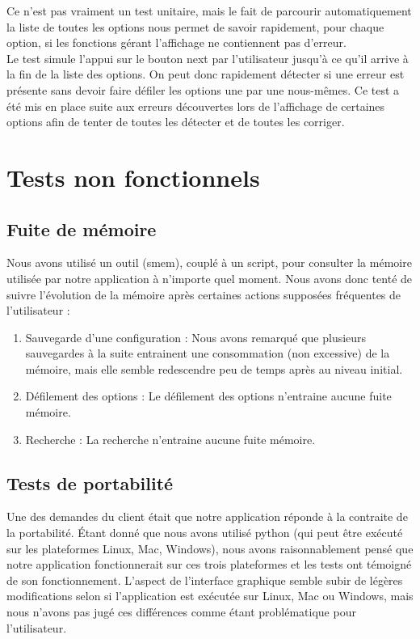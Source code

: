 \documentclass[17pts]{report}
\begin{document}
Ce n'est pas vraiment un test unitaire, mais le fait de parcourir
automatiquement la liste de toutes les options nous permet de savoir
rapidement, pour chaque option, si les fonctions gérant l'affichage ne
contiennent pas d'erreur. \\

Le test simule l'appui sur le bouton next par l'utilisateur jusqu'à ce qu'il
arrive à la fin de la liste des options. On peut donc rapidement détecter si
une erreur est présente sans devoir faire défiler les options une par une
nous-mêmes. Ce test a été mis en place suite aux erreurs découvertes lors de
l'affichage de certaines options afin de tenter de toutes les détecter et de
toutes les corriger.

    \section{Tests non fonctionnels}
    \label{sec:Tests non fonctionnels}
\subsection{Fuite de mémoire}
\label{sub:Fuite de mémoire}

Nous avons utilisé un outil (smem), couplé à un script, pour consulter la
mémoire utilisée par notre application à n'importe quel moment. Nous avons donc
tenté de suivre l'évolution de la mémoire après certaines actions supposées
fréquentes de l'utilisateur :

\begin{enumerate}
    \item Sauvegarde d'une configuration : Nous avons remarqué que plusieurs
        sauvegardes à la suite entrainent une consommation (non excessive) de
        la mémoire, mais elle semble redescendre peu de temps après au niveau
        initial.
    \item Défilement des options : Le défilement des options n'entraine
          aucune fuite mémoire.
    \item Recherche : La recherche n'entraine aucune fuite mémoire.
\end{enumerate}


\subsection{Tests de portabilité}

Une des demandes du client était que notre application réponde à la contraite
de la portabilité. Étant donné que nous avons utilisé python (qui peut être
exécuté sur les plateformes Linux, Mac, Windows), nous avons raisonnablement
pensé que notre application fonctionnerait sur ces trois plateformes et les
tests ont témoigné de son fonctionnement. L'aspect de l'interface graphique
semble subir de légères modifications selon si l'application est exécutée sur
Linux, Mac ou Windows, mais nous n'avons pas jugé ces différences comme étant
problématique pour l'utilisateur.\\
\end{document}
